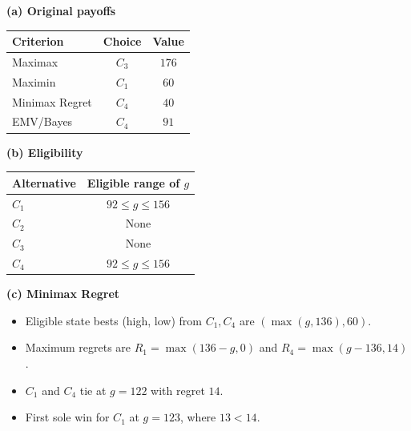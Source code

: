 {\noindent\begin{minipage}[t]{0.35\textwidth}
  \vspace{0pt}
  \textbf{(a) Original payoffs}\par\smallskip
  \setlength{\tabcolsep}{3pt}
  \begin{tabular}{@{}lcc@{}}
    \toprule
    Criterion & Choice & Value\\ \midrule
    Maximax & $C_3$ & $176$\\
    Maximin & $C_1$ & $60$\\
    Minimax Regret & $C_4$ & $40$\\
    EMV/Bayes & $C_4$ & $91$\\
    \bottomrule
  \end{tabular}
\end{minipage}\hfill
\begin{minipage}[t]{0.62\textwidth}
  \vspace{0pt}
  \textbf{(b) Eligibility}\par\smallskip
  \begin{tabular}{@{}lc@{}}
    \toprule
    Alternative & Eligible range of $g$\\ \midrule
    $C_1$ & $92\le g\le156$\\
    $C_2$ & None\\
    $C_3$ & None\\
    $C_4$ & $92\le g\le156$\\
    \bottomrule
  \end{tabular}\par\smallskip
  \textbf{(c) Minimax Regret}
  \begin{itemize}[leftmargin=*,nosep]
    \item Eligible state bests (high, low) from $C_1,C_4$ are $(\max(g,136),60)$.
    \item Maximum regrets are $R_1=\max(136-g,0)$ and $R_4=\max(g-136,14)$.
    \item $C_1$ and $C_4$ tie at $g=122$ with regret $14$.
    \item First sole win for $C_1$ at $\boxed{g=123}$, where $13<14$.
  \end{itemize}
\end{minipage}

}
